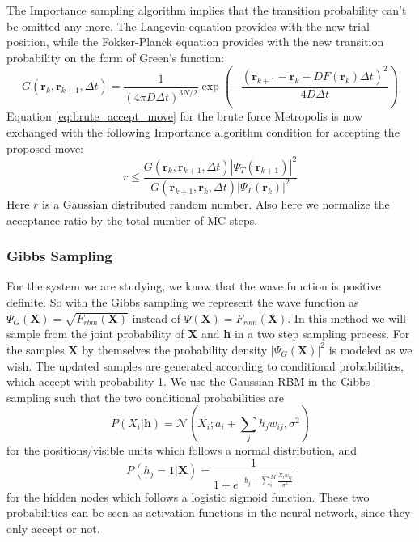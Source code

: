 \documentclass[12pt,a4paper,english]{article}
\begin{document}
The Importance sampling algorithm implies that the transition probability can't be omitted any more. The Langevin equation provides with the new trial position, while the Fokker-Planck equation provides with the new transition probability on the form of Green's function:
\begin{equation}
\label{eq:Green}
G(\textbf{r}_k,\textbf{r}_{k+1},\Delta t)=\frac{1}{(4\pi D\Delta t)^{3N/2}}\exp\left(-\frac{(\textbf{r}_{k+1}-\textbf{r}_{k}-DF(\textbf{r}_k)\Delta t)^2}{4D\Delta t}\right)
\end{equation}
Equation \ref{eq:brute_accept_move} for the brute force Metropolis is now exchanged with the following Importance algorithm condition for accepting the proposed move:
\begin{equation}
\label{eq:importance_accept_move}
r\leq\frac{G(\textbf{r}_k,\textbf{r}_{k+1},\Delta t)|\Psi_T(\textbf{r}_{k+1})|^2}{G(\textbf{r}_{k+1},\textbf{r}_{k},\Delta t)|\Psi_T(\textbf{r}_k)|^2}
\end{equation}
Here $r$ is a Gaussian distributed random number. Also here we normalize the acceptance ratio by the total number of MC steps.

\subsubsection{Gibbs Sampling}
\label{subsubsect:Gibbs}
For the system we are studying, we know that the wave function is positive definite. So with the Gibbs sampling we represent the wave function as $\Psi_G(\textbf{X})=\sqrt{F_{rbm}(\textbf{X})}$ instead of $\Psi(\textbf{X})=F_{rbm}(\textbf{X})$. In this method we will sample from the joint probability of \textbf{X} and \textbf{h} in a two step sampling process. For the samples \textbf{X} by themselves the probability density $|\Psi_G(\textbf{X})|^2$ is modeled as we wish. The updated samples are generated according to conditional probabilities, which accept with probability 1. We use the Gaussian RBM in the Gibbs sampling such that the two conditional probabilities are 
\begin{equation}
\label{eq:prob_visible}
P(X_i|\textbf{h})=\mathcal{N}(X_i; a_i+\sum_{j}h_jw_{ij},\sigma^2)
\end{equation}
for the positions/visible units which follows a normal distribution, and
\begin{equation}
\label{eq:prob_hidden}
P(h_j=1|\textbf{X})=\frac{1}{1+e^{-b_j -\sum_{i}^{M}\frac{X_iw_{ij}}{\sigma^2}}}
\end{equation}
for the hidden nodes which follows a logistic sigmoid function. These two probabilities can be seen as activation functions in the neural network, since they only accept or not. 
\end{document}
